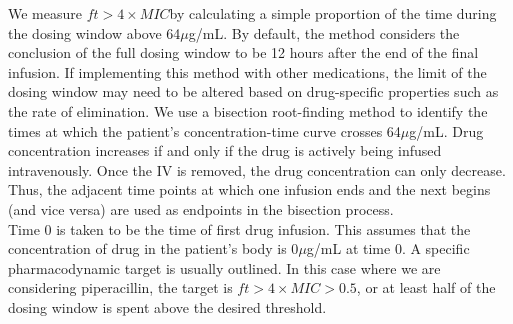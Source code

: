\documentclass{article}\usepackage[]{graphicx}\usepackage[]{color}
\newcommand{\mic}{$ft > 4 \times MIC$}
\begin{document}
We measure \mic by calculating a simple proportion of the time during the dosing window above 64$\mu$g/mL. By default, the method considers the conclusion of the full dosing window to be 12 hours after the end of the final infusion. If implementing this method with other medications, the limit of the dosing window may need to be altered based on drug-specific properties such as the rate of elimination. We use a bisection root-finding method to identify the times at which the patient's concentration-time curve crosses 64$\mu$g/mL. Drug concentration increases if and only if the drug is actively being infused intravenously. Once the IV is removed, the drug concentration can only decrease. Thus, the adjacent time points at which one infusion ends and the next begins (and vice versa) are used as endpoints in the bisection process.\\


Time 0 is taken to be the time of first drug infusion. This assumes that the concentration of drug in the patient's body is 0$\mu$g/mL at time 0. A specific pharmacodynamic target is usually outlined. In this case where we are considering piperacillin, the target is \mic $> 0.5$, or at least half of the dosing window is spent above the desired threshold.

\end{document}
